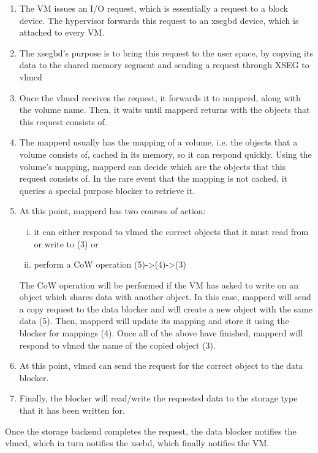 \begin{enumerate}
	\item The VM issues an I/O request, which is essentially a request to a 
		block device. The hypervisor forwards this request to an xsegbd 
		device, which is attached to every VM.
	\item The xsegbd's purpose is to bring this request to the user space, 
		by copying its data to the shared memory segment and sending a
		request through XSEG to vlmcd
	\item Once the vlmcd receives the request, it forwards it to
		mapperd, along with the volume name. Then, it waits until
		mapperd returns with the objects that this request consists of.  
	\item The mapperd usually has the mapping of a volume, i.e. the objects 
		that a volume consists of, cached in its memory, so it can 
		respond quickly.  Using the volume's mapping, mapperd can  
		decide which are the objects that this request consists of.
		In the rare event that the mapping is not cached, it queries a 
		special purpose blocker to retrieve it.
	\item At this point, mapperd has two courses of action:
		\begin{enumerate}[i)]
			\item it can either respond to vlmcd the correct 
				objects	that it must read from or write to (3) 
				or
			\item perform a CoW operation (5)->(4)->(3)
		\end{enumerate}

		The CoW operation will be performed if the VM has asked to 
		write on an object which shares data with another object.  In 
		this case, mapperd will send a copy request to the data blocker 
		and will create a new object with the same data (5).  Then, 
		mapperd will update its mapping and store it using the blocker 
		for mappings (4). Once all of the above have finished, mapperd 
		will respond to vlmcd the name of the copied object (3).
	\item At this point, vlmcd can send the request for the correct object 
		to the data blocker.
	\item Finally, the blocker will read/write the requested data to the 
		storage type that it has been written for.
\end{enumerate}

Once the storage backend completes the request, the data blocker notifies the 
vlmcd, which in turn notifies the xsebd, which finally notifies the VM.

